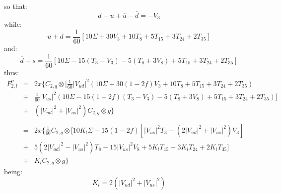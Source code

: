 \documentclass[10pt,a4paper]{article}
\begin{document}
so that:
\begin{equation}
d-u+\overline{u}-\overline{d} = - V_3
\end{equation}
while:
\begin{equation}
u+\overline{d} = \frac1{60}[10\Sigma+30V_3+10T_8+5T_{15}+3T_{24}+2T_{35}]
\end{equation}
and:
\begin{equation}
\overline{d}+s = \frac1{60}[10\Sigma-15(T_3-V_3)-5(T_8+3V_8)+5T_{15}+3T_{24}+2T_{35}]
\end{equation}
thus:
\begin{equation}
\begin{array}{rcl}  
F_{2,l}^{\nu} &=& \displaystyle 2x\Bigg\{C_{2,q}\otimes\Bigg[\frac1{60}|V_{ud}|^2 \left(10\Sigma+30(1-2f)V_3+10T_8+5T_{15}+3T_{24}+2T_{35}\right)\\
              &+& \displaystyle \frac1{60}|V_{us}|^2\left(10\Sigma-15(1-2f)(T_3-V_3)-5(T_8+3V_8)+5T_{15}+3T_{24}+2T_{35}\right)\Bigg]\\
              &+& \left(|V_{ud}|^2+|V_{us}|^2\right)C_{2,g}\otimes g\Bigg\}\\
\\
              &=& \displaystyle 2x\Bigg\{\frac1{60}C_{2,q}\otimes\Bigg[10K_l\Sigma-15(1-2f)\left[|V_{us}|^2T_3-(2|V_{ud}|^2+|V_{us}|^2)V_3\right]\\
              &+& \displaystyle 5(2|V_{ud}|^2-|V_{us}|^2)T_8-15|V_{us}|^2V_8+5K_lT_{15}+3K_lT_{24}+2K_lT_{35}\Bigg]\\
              &+& K_lC_{2,g}\otimes g\Bigg\}
\end{array}
\end{equation}
being:
\begin{equation}
K_l = 2\left(|V_{ud}|^2+|V_{us}|^2\right)
\end{equation}
\end{document}

